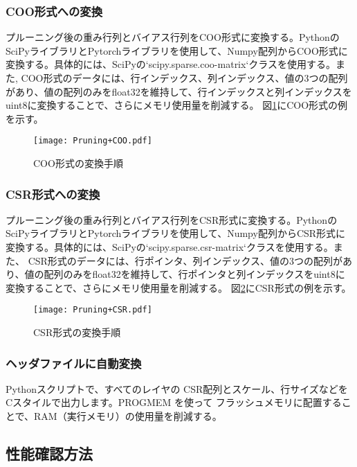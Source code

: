 \documentclass[uplatex,dvipdfmx]{jsarticle}
\begin{document}
\subsubsection{COO形式への変換}
プルーニング後の重み行列とバイアス行列をCOO形式に変換する。PythonのSciPyライブラリとPytorchライブラリを使用して、Numpy配列からCOO形式に変換する。具体的には、SciPyの`scipy.sparse.coo-matrix`クラスを使用する。また,
COO形式のデータには、行インデックス、列インデックス、値の3つの配列があり、値の配列のみをfloat32を維持して、行インデックスと列インデックスをuint8に変換することで、さらにメモリ使用量を削減する。
図\ref{fig:coo}にCOO形式の例を示す。
\begin{figure}[h]
    \centering
    \texttt{[image: Pruning+COO.pdf]}
    \caption{COO形式の変換手順}
    \label{fig:coo}
\end{figure}
\subsubsection{CSR形式への変換}
プルーニング後の重み行列とバイアス行列をCSR形式に変換する。PythonのSciPyライブラリとPytorchライブラリを使用して、Numpy配列からCSR形式に変換する。具体的には、SciPyの`scipy.sparse.csr-matrix`クラスを使用する。また、
CSR形式のデータには、行ポインタ、列インデックス、値の3つの配列があり、値の配列のみをfloat32を維持して、行ポインタと列インデックスをuint8に変換することで、さらにメモリ使用量を削減する。
図\ref{fig:csr}にCSR形式の例を示す。
\begin{figure}[h]
    \centering
    \texttt{[image: Pruning+CSR.pdf]}
    \caption{CSR形式の変換手順}
    \label{fig:csr}
\end{figure}
\newpage
\subsubsection{ヘッダファイルに自動変換}
Pythonスクリプトで、すべてのレイヤの CSR配列とスケール、行サイズなどをCスタイルで出力します。PROGMEM を使って フラッシュメモリに配置することで、RAM（実行メモリ）の使用量を削減する。
\subsection{性能確認方法}
\end{document}
